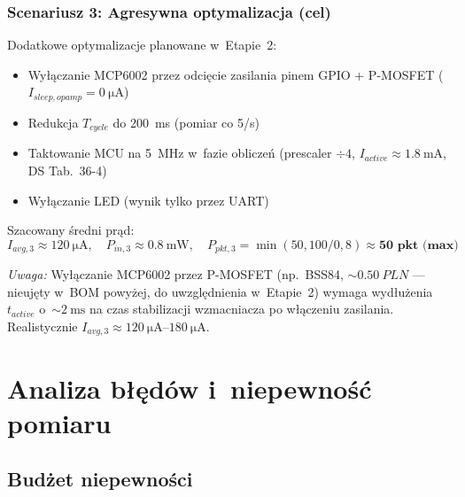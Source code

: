 \documentclass[a4paper,11pt]{article}
\begin{document}
\subsubsection{Scenariusz 3: Agresywna optymalizacja (cel)}

Dodatkowe optymalizacje planowane w~Etapie~2:
\begin{itemize}[nosep]
    \item Wyłączanie MCP6002 przez odcięcie zasilania pinem GPIO + P-MOSFET
          ($I_{sleep,opamp} = \SI{0}{\micro\ampere}$)
    \item Redukcja $T_{cycle}$ do \SI{200}{\milli\second} (pomiar co 5/s)
    \item Taktowanie MCU na \SI{5}{\mega\hertz} w~fazie obliczeń
          (prescaler $\div 4$, $I_{active} \approx \SI{1,8}{\milli\ampere}$, DS Tab.~36-4)
    \item Wyłączanie LED (wynik tylko przez UART)
\end{itemize}

Szacowany średni prąd:
\begin{equation}
    I_{avg,3} \approx \SI{120}{\micro\ampere}, \quad
    P_{in,3} \approx \SI{0,8}{\milli\watt}, \quad
    P_{pkt,3} = \min(50, 100/0{,}8) \approx \textbf{50~pkt~(max)}
    \label{eq:moc_scen3}
\end{equation}

\textit{Uwaga:} Wyłączanie MCP6002 przez P-MOSFET (np.\ BSS84, ${\sim}\SI{0,50}{PLN}$
--- nieujęty w~BOM powyżej, do uwzględnienia w~Etapie~2) wymaga wydłużenia
$t_{active}$ o~${\sim}\SI{2}{\milli\second}$ na czas stabilizacji wzmacniacza
po włączeniu zasilania. Realistycznie $I_{avg,3} \approx \SIrange{120}{180}{\micro\ampere}$.


\section{Analiza błędów i~niepewność pomiaru}
\label{sec:bledy}

\subsection{Budżet niepewności}
\end{document}
